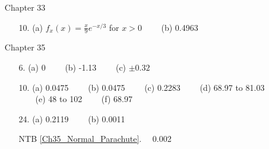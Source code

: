 \documentclass[12pt]{article}
\begin{document}
\begin{itemize}
\item[Chapter 33]         \label{ANS_33}
	\begin{itemize}
	\item[10.] (a)  $f_x(x)=\frac{x}{9}e^{-x/3}$ for $ x> 0$ \ \ \ \ (b)  0.4963
	\end{itemize}

\item[Chapter 35]        \label{ANS_35}
	\begin{itemize}
	\item[6.] (a) 0  \ \ \ \ (b) -1.13  \ \ \ \   (c) $\pm 0.32$ 
	\item[10.] (a) 0.0475  \ \ \ \ (b) 0.0475  \ \ \ \   (c)  0.2283 \ \ \ \ (d) 68.97 to 81.03 \ \ \ \  (e) 48 to 102  \ \ \ \  \newline (f)  68.97
	\item[24.] (a) 0.2119  \ \ \ \ (b)  0.0011
	\item[NTB \ref{Ch35_Normal_Parachute}.]\ \   0.002
	\end{itemize}





%





\end{itemize}  %
\end{document}

